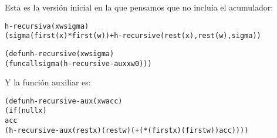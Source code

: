 \begin{aibox}{\pseudocode}
Esta es la versión inicial en la que pensamos que no incluía el acumulador: 
\begin{alltt}
h-recursiva (x w sigma)
     (sigma(first(x)*first(w)) + h-recursive(rest(x),rest(w),sigma))
\end{alltt}
\end{aibox}
\begin{aibox}{\code}

\begin{alltt}

(defun h-recursive (x w sigma) 
        (funcall sigma (h-recursive-aux x w 0)))

\end{alltt}
Y la función auxiliar es:
\begin{alltt}
(defun h-recursive-aux (x w acc)
    (if (null x)
          acc
    (h-recursive-aux (rest x) (rest w) ( + (* (first x)  (first w)) acc))))


\end{alltt}
\end{aibox}
